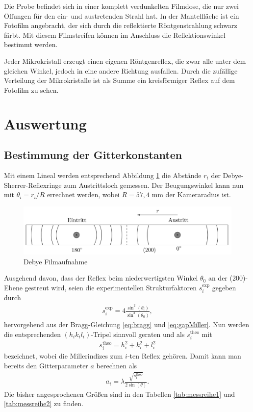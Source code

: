 Die Probe befindet sich in einer komplett verdunkelten Filmdose, die nur zwei Öffungen für den ein- und austretenden Strahl hat. In der Mantelfläche ist ein Fotofilm angebracht, der sich durch die reflektierte Röntgenstrahlung schwarz färbt. Mit diesem Filmstreifen können im Anschluss die Reflektionswinkel bestimmt werden.

Jeder Mikrokristall erzeugt einen eigenen Röntgenreflex, die zwar alle unter dem gleichen Winkel, jedoch in eine andere Richtung ausfallen. Durch die zufällige Verteilung der Mikrokristalle ist als Summe ein kreisförmiger Reflex auf dem Fotofilm zu sehen.


\section{Auswertung}
\subsection{Bestimmung der Gitterkonstanten}

Mit einem Lineal werden entsprechend Abbildung \ref{pic:debyefilm} die Abstände $r_i$ der Debye-Sherrer-Reflexringe zum Austrittsloch gemessen. Der 
Beugungswinkel kann nun mit $\theta_i = r_i/R$ errechnet werden, wobei $R=57,4$ mm der Kameraradius ist. 
\begin{figure}[H]
 \includegraphics[width=\textwidth]{../pics/debyestreifen.jpg}
 \caption{Debye Filmaufnahme}
 \label{pic:debyefilm}
\end{figure}
\noindent Ausgehend davon, dass der Reflex beim niederwertigsten
Winkel $\theta_0$ an der (200)-Ebene gestreut wird, seien die experimentellen Strukturfaktoren $s^\text{exp}_i$ gegeben durch
\begin{align}
 s^\text{exp}_i = 4\frac{\sin^2(\theta_i)}{\sin^2(\theta_0)},
 \label{eq:structExp}
\end{align}
hervorgehend aus der Bragg-Gleichung \eqref{eq:bragg} und \eqref{eq:gapMiller}. Nun werden die entsprechenden $(h_ik_il_i)$-Tripel sinnvoll geraten und als 
$s^\text{theo}_i$ mit
\begin{align}
 s^\text{theo}_i = h_i^2 + k_i^2 + l_i^2
 \label{eq:structTheo}
\end{align}
bezeichnet, wobei die Millerindizes zum $i$-ten Reflex gehören. Damit kann man bereits den Gitterparameter $a$ berechnen als
\begin{align}
 a_i = \lambda\frac{\sqrt{s^\text{theo}_i}}{2\sin(\theta)}.
 \label{eq:gitterparameter}
\end{align}
Die bisher angesprochenen Größen sind in den Tabellen \ref{tab:messreihe1} und \ref{tab:messreihe2} zu finden.


